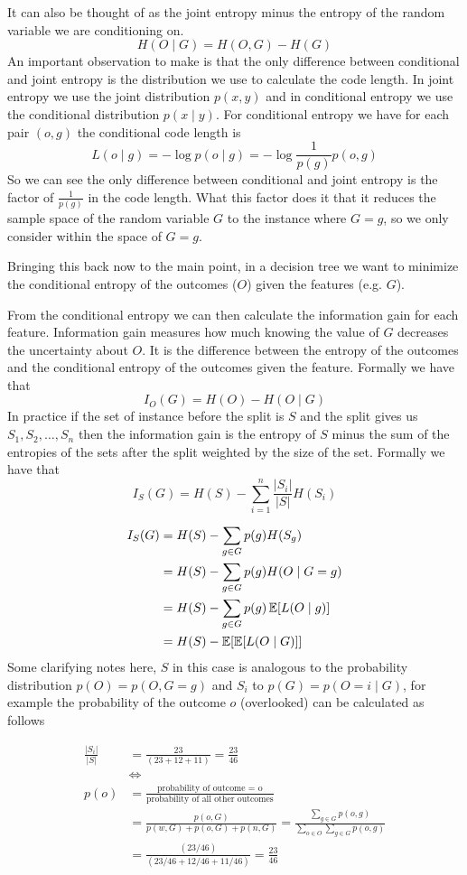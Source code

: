 \documentclass[12pt]{article}
\begin{document}
\smallskip
It can also be thought of as the joint entropy minus the entropy of the random variable we are conditioning on.
\[
    H(O\mid G) = H(O, G) - H(G)
\]
An important observation to make is that the only difference between conditional and joint entropy is the distribution we use to calculate the code length. In joint entropy we use the joint distribution $p(x, y)$ and in conditional entropy we use the conditional distribution $p(x\mid y)$. For conditional entropy we have for each pair $(o, g)$ the conditional code length is
\[
    L(o\mid g) = -\log p(o\mid g) = -\log \frac{1}{p(g)}p(o, g)
\]
So we can see the only difference between conditional and joint entropy is the factor of $\frac{1}{p(g)}$ in the code length. What this factor does it that it reduces the sample space of the random variable $G$ to the instance where $G = g$, so we only consider within the space of $G = g$.

\smallskip
Bringing this back now to the main point, in a decision tree we want to minimize the conditional entropy of the outcomes ($O$) given the features (e.g. $G$).

\smallskip
From the conditional entropy we can then calculate the information gain for each feature. Information gain measures how much knowing the value of $G$ decreases the uncertainty about $O$. It is the difference between the entropy of the outcomes and the conditional entropy of the outcomes given the feature. Formally we have that
\[
    I_O(G) = H(O) - H(O\mid G)
\]
In practice if the set of instance before the split is $S$ and the split gives us $S_1, S_2, \ldots, S_n$ then the information gain is the entropy of $S$ minus the sum of the entropies of the sets after the split weighted by the size of the set. Formally we have that
\[
    I_S(G) = H(S) - \sum_{i=1}^n\frac{|S_i|}{|S|}H(S_i)  
\]

\begin{align*}
    I_S(G) &= H(S) - \sum_{g \in G}p(g)H(S_g) \\ 
    &= H(S) - \sum_{g\in G}p(g)H(O\mid G = g) \\  
    &= H(S) - \sum_{g\in G}p(g)\operatorname{\mathbb{E}}[L(O\mid g)] \\ 
    &= H(S) - \operatorname{\mathbb{E}}[\operatorname{\mathbb{E}}[L(O\mid G)]]
\end{align*}
Some clarifying notes here, $S$ in this case is analogous to the probability distribution $p(O) = p(O, G = g)$ and $S_i$ to $p(G) = p(O = i\mid G)$, for example the probability of the outcome $o$ (overlooked) can be calculated as follows 

\begin{align*}
    \frac{|S_i|}{|S|} & = \frac{23}{(23 + 12 + 11)} = \frac{23}{46}\\ 
    & \Leftrightarrow \\ 
    p(o) &= \frac{\text{probability of outcome = o}}{\text{probability of all other outcomes}} \\ 
    & = \frac{p(o, G)}{p(w, G) + p(o, G) + p(n, G)} = \frac{\sum_{g\in G} p(o, g)}{\sum_{o \in O} \sum_{g\in G} p(o, g)} \\
    & = \frac{(23/46)}{(23/46 + 12/46 + 11/46)} = \frac{23}{46}
\end{align*}
\end{document}
